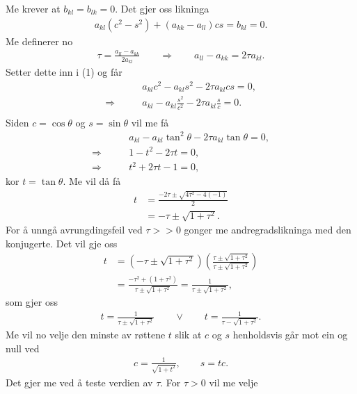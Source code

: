 \documentclass[11pt, a4paper]{article}
\begin{document}
    Me krever at $b_{kl} = b_{lk} = 0$. Det gjer oss likninga
    \begin{align}
      a_{kl}(c^2 - s^2) + (a_{kk} - a_{ll})cs = b_{kl} = 0.
    \end{align}
    Me definerer no 
    \begin{align*}
      \tau = \frac{a_{ll} - a_{kk}}{2a_{kl}} \qquad \Rightarrow \qquad a_{ll} - a_{kk} = 2\tau a_{kl}.
    \end{align*}
    Setter dette inn i (1) og får
    \begin{align*}
      &a_{kl}c^2 - a_{kl}s^2 - 2\tau a_{kl}cs = 0, \\
      \Rightarrow \qquad &a_{kl} - a_{kl}\frac{s^2}{c^2} - 2\tau a_{kl}\frac{s}{c} = 0. \\
    \end{align*}
    Siden $c = \cos{\theta}$ og $s = \sin{\theta}$ vil me få 
    \begin{align*}
      &a_{kl} - a_{kl}\tan^2{\theta} - 2\tau a_{kl} \tan{\theta} = 0, \\
      \Rightarrow \qquad &1 - t^2 - 2\tau t = 0, \\
      \Rightarrow \qquad &t^2 + 2\tau t - 1 = 0,
    \end{align*}
    kor $t = \tan{\theta}$. Me vil då få 
    \begin{align*}
      t &= \frac{-2\tau \pm \sqrt{4\tau^2 - 4(-1)}}{2} \\
      &= -\tau \pm \sqrt{1 + \tau^2}.
    \end{align*}
    For å unngå avrungdingsfeil ved $\tau >> 0$ gonger me andregradslikninga med den konjugerte. Det vil gje oss
    \begin{align*}
      t &= \left( -\tau \pm \sqrt{1 + \tau^2} \right)\left( \frac{\tau \pm \sqrt{1 + \tau^2}}{\tau \pm \sqrt{1 + \tau^2}} \right) \\
      &= \frac{-\tau^2 + (1 + \tau^2)}{\tau \pm \sqrt{1 + \tau^2}} = \frac{1}{\tau \pm \sqrt{1 + \tau^2}},
    \end{align*}
    som gjer oss
    \begin{align*}
      t = \frac{1}{\tau \pm \sqrt{1 + \tau^2}} \qquad \lor \qquad t = \frac{1}{\tau - \sqrt{1 + \tau^2}}.
    \end{align*}
    Me vil no velje den minste av røttene $t$ slik at $c$ og $s$ henholdsvis går mot ein og null ved
    \begin{align*}
      c = \frac{1}{\sqrt{1 + t^2}}, \qquad s = tc.
    \end{align*}
    Det gjer me ved å teste verdien av $\tau$. For $\tau > 0$ vil me velje 
\end{document}
